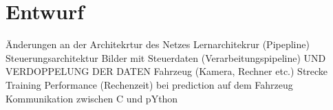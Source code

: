 %
\chapter{Entwurf}


Änderungen an der Architekrtur des Netzes
Lernarchitekrur (Pipepline)
Steuerungsarchitektur
Bilder mit Steuerdaten (Verarbeitungspipeline) UND VERDOPPELUNG DER DATEN
Fahrzeug (Kamera, Rechner etc.)
Strecke 
Training 
Performance (Rechenzeit) bei prediction auf dem Fahrzeug
Kommunikation zwischen C und pYthon
